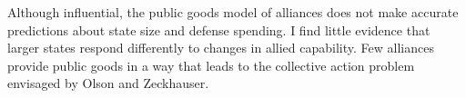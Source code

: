 \documentclass[12pt]{article}
\begin{document}
Although influential, the public goods model of alliances does not make accurate predictions about state size and defense spending. 
I find little evidence that larger states respond differently to changes in allied capability. 
Few alliances provide public goods in a way that leads to the collective action problem envisaged by Olson and Zeckhauser. 



\singlespace


 
\end{document}
